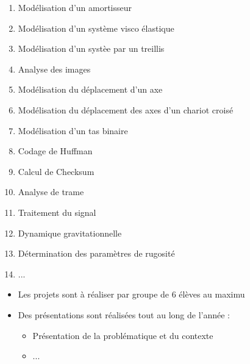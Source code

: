 \documentclass[10pt,fleqn]{article} %
\begin{document}

\vspace{10cm}
\pagestyle{fancy}
\thispagestyle{plain}


\def\columnseprulecolor{\color{ocre}}
\setlength{\columnseprule}{0.4pt} 



\begin{enumerate}
\item Modélisation d'un amortisseur
\item Modélisation d'un système visco élastique
\item Modélisation d'un systèe par un treillis
\item Analyse des images
\item Modélisation du déplacement d'un axe
\item Modélisation du déplacement des axes d'un chariot croisé
\item Modélisation d'un tas binaire
\item Codage de Huffman
\item Calcul de Checksum
\item Analyse de trame
\item Traitement du signal
\item Dynamique gravitationnelle
\item Détermination des paramètres de rugosité
\item ...
\end{enumerate}

\begin{itemize}
\item Les projets sont à réaliser par groupe de 6 élèves au maximu
\item Des présentations sont réalisées tout au long de l'année :
\begin{itemize}
\item Présentation de la problématique et du contexte
\item ...
\end{itemize}
\end{itemize}
\end{document}
